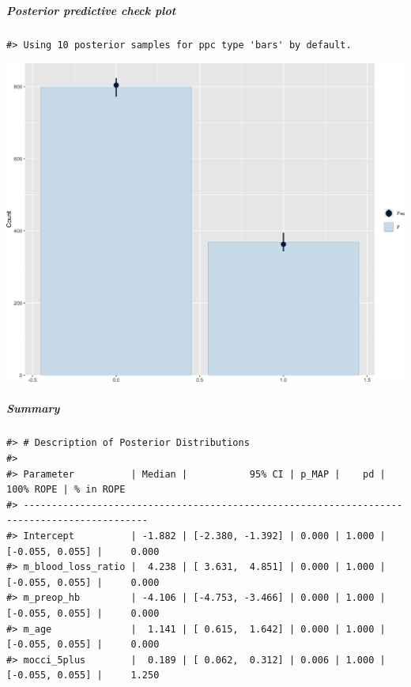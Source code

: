 \documentclass[
]{article}
\begin{document}
\hypertarget{posterior-predictive-check-plot-1}{%
\subparagraph{Posterior predictive check plot}\label{posterior-predictive-check-plot-1}}

\begin{verbatim}
#> Using 10 posterior samples for ppc type 'bars' by default.
\end{verbatim}

\begin{center}\includegraphics[width=1\linewidth]{notebook_files/figure-latex/model1reduced_ppcheck-1} \end{center}

\hypertarget{summary-1}{%
\subparagraph{Summary}\label{summary-1}}

\begin{verbatim}
#> # Description of Posterior Distributions
#> 
#> Parameter          | Median |           95% CI | p_MAP |    pd |       100% ROPE | % in ROPE
#> --------------------------------------------------------------------------------------------
#> Intercept          | -1.882 | [-2.380, -1.392] | 0.000 | 1.000 | [-0.055, 0.055] |     0.000
#> m_blood_loss_ratio |  4.238 | [ 3.631,  4.851] | 0.000 | 1.000 | [-0.055, 0.055] |     0.000
#> m_preop_hb         | -4.106 | [-4.753, -3.466] | 0.000 | 1.000 | [-0.055, 0.055] |     0.000
#> m_age              |  1.141 | [ 0.615,  1.642] | 0.000 | 1.000 | [-0.055, 0.055] |     0.000
#> mocci_5plus        |  0.189 | [ 0.062,  0.312] | 0.006 | 1.000 | [-0.055, 0.055] |     1.250
\end{verbatim}
\end{document}
